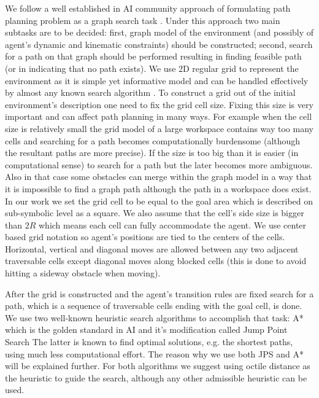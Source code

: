 \documentclass[procedia]{easychair}
\begin{document}
We follow a well established in AI community approach of formulating path planning problem as a graph search task \cite{ferguson2005guide}. Under this approach two main subtasks are to be decided: first, graph model of the environment (and possibly of agent's dynamic and kinematic constraints) should be constructed; second, search for a path on that graph should be performed resulting in finding feasible path (or in indicating that no path exists). We use 2D regular grid to represent the environment as it is simple yet informative model and can be handled effectively by almost any known search algorithm \cite{yap2002grid}. To construct a grid out of the initial environment's description one need to fix the grid cell size. Fixing this size is very important and can affect path planning in many ways. For example when the cell size is relatively small the grid model of a large workspace contains way too many cells and searching for a path becomes computationally burdensome (although the resultant paths are more precise). If the size is too big than it is easier (in computational sense) to search for a path but the later becomes more ambiguous. Also in that case some obstacles can merge within the graph model in a way that it is impossible to find a graph path although the path in a workspace does exist. In our work we set the grid cell to be equal to the goal area which is described on sub-symbolic level as a square. We also assume that the cell's side size is bigger than $2R$ which means each cell can fully accommodate the agent. We use center based grid notation so agent's positions are tied to the centers of the cells. Horizontal, vertical and diagonal moves are allowed between any two adjacent traversable cells except diagonal moves along blocked cells (this is done to avoid hitting a sideway obstacle when moving).

After the grid is constructed and the agent's transition rules are fixed search for a path, which is a sequence of traversable cells ending with the goal cell, is done. We use two well-known heuristic search algorithms to accomplish that task: A* \cite{hart1968formal} which is the golden standard in AI and it's  modification called Jump Point Search \cite{harabor2011online} The latter is known to find optimal solutions, e.g. the shortest paths, using much less computational effort. The reason why we use both JPS and A* will be explained further. For both algorithms we suggest using octile distance as the heuristic to guide the search, although any other admissible heuristic can be used.
\end{document}

